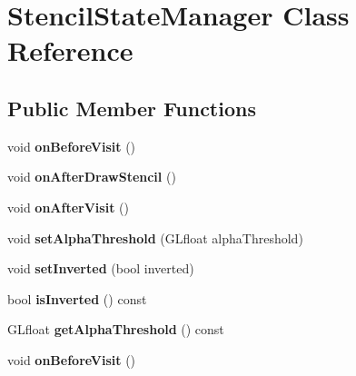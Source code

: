\hypertarget{classStencilStateManager}{}\section{Stencil\+State\+Manager Class Reference}
\label{classStencilStateManager}
\subsection*{Public Member Functions}
\begin{DoxyCompactItemize}
\item 
\mbox{\label{classStencilStateManager_a12b2cce9f90a73a57c183f11ccd46ccc}} 
void {\bfseries on\+Before\+Visit} ()
\item 
\mbox{\label{classStencilStateManager_ac56dc1dd62110d3f534063a2c8fc7c06}} 
void {\bfseries on\+After\+Draw\+Stencil} ()
\item 
\mbox{\label{classStencilStateManager_a4c4d3710f14803aaa96de5e5d1d6b31c}} 
void {\bfseries on\+After\+Visit} ()
\item 
\mbox{\label{classStencilStateManager_a4f390721473ab5c62b814cf77e90eaa4}} 
void {\bfseries set\+Alpha\+Threshold} (G\+Lfloat alpha\+Threshold)
\item 
\mbox{\label{classStencilStateManager_a68f2d10edc7e248db9abc3d5bd3bf8d3}} 
void {\bfseries set\+Inverted} (bool inverted)
\item 
\mbox{\label{classStencilStateManager_ab23f89330a5a8da08949826b84874ede}} 
bool {\bfseries is\+Inverted} () const
\item 
\mbox{\label{classStencilStateManager_a74774c4831b27c763042d9340d9bd4a1}} 
G\+Lfloat {\bfseries get\+Alpha\+Threshold} () const
\item 
\mbox{\label{classStencilStateManager_a12b2cce9f90a73a57c183f11ccd46ccc}} 
void {\bfseries on\+Before\+Visit} ()
\item 
\mbox{\label{classStencilStateManager_ac56dc1dd62110d3f534063a2c8fc7c06}} 

\end{DoxyCompactItemize}
